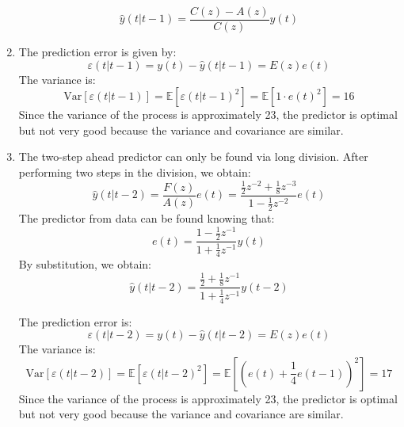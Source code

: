\begin{enumerate}
        \[\hat{y}(t|t-1)=\dfrac{C(z)-A(z)}{C(z)}y(t)\]
    \item The prediction error is given by:
        \[\varepsilon(t|t-1)=y(t)-\hat{y}(t|t-1)=E(z)e(t)\]
        The variance is:
        \[\text{Var}\left[\varepsilon(t|t-1)\right]=\mathbb{E}\left[\varepsilon(t|t-1)^2\right]=\mathbb{E}\left[1 \cdot e(t)^2\right]=16\]
        Since the variance of the process is approximately 23, the predictor is optimal but not very good because the variance and covariance are similar.
    \item The two-step ahead predictor can only be found via long division. 
        After performing two steps in the division, we obtain:
        \[\hat{y}(t|t-2)=\dfrac{F(z)}{A(z)}e(t)=\dfrac{\frac{1}{2}z^{-2}+\frac{1}{8}z^{-3}}{1-\frac{1}{2}z^{-2}}e(t)\]
        The predictor from data can be found knowing that:
        \[e(t)=\dfrac{1-\frac{1}{2}z^{-1}}{1+\frac{1}{4}z^{-1}}y(t)\]
        By substitution, we obtain:
        \[\hat{y}(t|t-2)=\dfrac{\frac{1}{2}+\frac{1}{8}z^{-1}}{1+\frac{1}{4}z^{-1}}y(t-2)\]
        
        The prediction error is:
        \[\varepsilon(t|t-2)=y(t)-\hat{y}(t|t-2)=E(z)e(t)\]
        The variance is: 
        \[\text{Var}\left[\varepsilon(t|t-2)\right]=\mathbb{E}\left[\varepsilon(t|t-2)^2\right]=\mathbb{E}\left[\left( e(t) +\frac{1}{4}e(t-1) \right)^2\right]=17\]
        Since the variance of the process is approximately 23, the predictor is optimal but not very good because the variance and covariance are similar.
\end{enumerate}